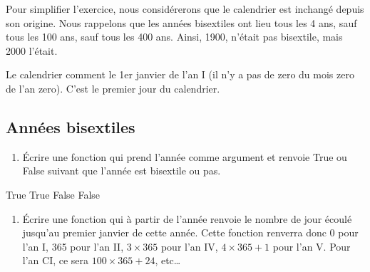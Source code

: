 \documentclass[letterpaper,10pt,english]{sphinxhowto}
\begin{document}
\sphinxAtStartPar
Pour simplifier l’exercice, nous considérerons que le calendrier est inchangé depuis son origine. Nous rappelons que les années bisextiles ont lieu tous les 4 ans, sauf tous les 100 ans, sauf tous les 400 ans. Ainsi, 1900, n’était pas bisextile, mais 2000 l’était.

\sphinxAtStartPar
Le calendrier comment le 1er janvier de l’an I (il n’y a pas de zero du mois zero de l’an zero). C’est le premier jour du calendrier.


\subsection{Années bisextiles}
\label{\detokenize{devoir_maison_Devoir Maison:annees-bisextiles}}\begin{enumerate}
%
\item {} 
\sphinxAtStartPar
Écrire une fonction qui prend l’année comme argument et renvoie True ou False suivant que l’année est bisextile ou pas.

\end{enumerate}

\begin{sphinxVerbatim}[commandchars=\\\{\}]
\end{sphinxVerbatim}

\begin{sphinxVerbatim}[commandchars=\\\{\}]
True
True
False
False
\end{sphinxVerbatim}
\begin{enumerate}
%
\setcounter{enumi}{1}
\item {} 
\sphinxAtStartPar
Écrire une fonction qui à partir de l’année renvoie le nombre de jour écoulé jusqu’au premier janvier de cette année. Cette fonction renverra donc 0 pour l’an I, 365 pour l’an II, \(3\times365\) pour l’an IV, \(4\times365+1\) pour l’an V. Pour l’an CI, ce sera \(100\times 365 + 24\), etc…

\end{enumerate}
\end{document}
